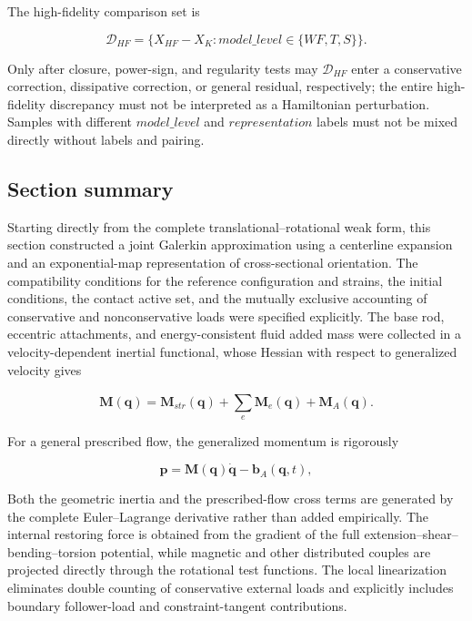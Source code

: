 The high-fidelity comparison set is

\begin{equation}
\label{eq:galerkin-2-126}
\mathcal{D}_{HF} = \{ X_{HF} - X_{K}:model\_ level \in \{ WF,T,S\}\}.
\end{equation}

Only after closure, power-sign, and regularity tests may \(\mathcal{D}_{HF}\) enter a conservative correction, dissipative correction, or general residual, respectively; the entire high-fidelity discrepancy must not be interpreted as a Hamiltonian perturbation. Samples with different \(model\_ level\) and \(representation\) labels must not be mixed directly without labels and pairing.

\subsection{Section summary}\label{sec:galerkin-2-12}

Starting directly from the complete translational--rotational weak form, this section constructed a joint Galerkin approximation using a centerline expansion and an exponential-map representation of cross-sectional orientation. The compatibility conditions for the reference configuration and strains, the initial conditions, the contact active set, and the mutually exclusive accounting of conservative and nonconservative loads were specified explicitly. The base rod, eccentric attachments, and energy-consistent fluid added mass were collected in a velocity-dependent inertial functional, whose Hessian with respect to generalized velocity gives

\begin{equation}
\label{eq:galerkin-2-127}
\mathbf{M}\left( \mathbf{q} \right) = \mathbf{M}_{str}\left( \mathbf{q} \right) + \sum_{e}^{}\mathbf{M}_{e}\left( \mathbf{q} \right) + \mathbf{M}_{A}\left( \mathbf{q} \right).
\end{equation}

For a general prescribed flow, the generalized momentum is rigorously

\begin{equation}
\label{eq:galerkin-2-128}
\mathbf{p} = \mathbf{M}\left( \mathbf{q} \right)\dot{\mathbf{q}} - \mathbf{b}_{A}\left( \mathbf{q},t \right),
\end{equation}

Both the geometric inertia and the prescribed-flow cross terms are generated by the complete Euler--Lagrange derivative rather than added empirically. The internal restoring force is obtained from the gradient of the full extension--shear--bending--torsion potential, while magnetic and other distributed couples are projected directly through the rotational test functions. The local linearization eliminates double counting of conservative external loads and explicitly includes boundary follower-load and constraint-tangent contributions.

